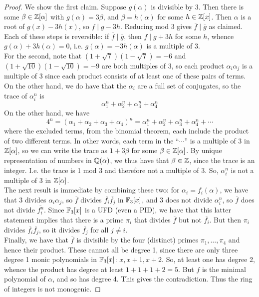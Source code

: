 \begin{proof} 
    We show the first claim. Suppose $g(\alpha)$ is divisible by 3. Then there is some $\beta \in \mathbb{Z}[\alpha]$ with $g(\alpha) = 3\beta$, and $\beta = h(\alpha)$ for some $h \in \mathbb{Z}[x]$. Then $\alpha$ is a root of $g(x)-3h(x)$, so $f \mid g-3h$. Reducing mod 3 gives $\overline{f} \mid \overline{g}$ as claimed. Each of these steps is reversible: if $\overline{f} \mid \overline{g}$, then $f \mid g+3h$ for some $h$, whence $g(\alpha)+3h(\alpha) = 0$, i.e. $g(\alpha) = -3h(\alpha)$ is a multiple of 3. \\

    For the second, note that $(1+\sqrt{7})(1-\sqrt{7}) = -6$ and $(1+\sqrt{10})(1-\sqrt{10}) = -9$ are both multiples of 3, so each product $\alpha_i\alpha_j$ is a multiple of 3 since each product consists of at least one of these pairs of terms. On the other hand, we do have that the $\alpha_i$ are a full set of conjugates, so the trace of $\alpha_i^n$ is
    \[ \alpha_1^n+\alpha_2^n+\alpha_3^n+\alpha_4^n \]
    On the other hand, we have
    \[ 4^n = (\alpha_1+\alpha_2+\alpha_3+\alpha_4)^n = \alpha_1^n+\alpha_2^n+\alpha_3^n+\alpha_4^n + \cdots \]
    where the excluded terms, from the binomial theorem, each include the product of two different terms. In other words, each term in the ``$\cdots$'' is a multiple of 3 in $\mathbb{Z}[\alpha]$, so we can write the trace as $1+3\beta$ for some $\beta \in \mathbb{Z}[\alpha]$. By unique representation of numbers in $\mathbb{Q}(\alpha)$, we thus have that $\beta \in \mathbb{Z}$, since the trace is an integer. I.e. the trace is 1 mod 3 and therefore not a multiple of 3. So, $\alpha_i^n$ is not a multiple of 3 in $\mathbb{Z}[\alpha]$. \\

    The next result is immediate by combining these two: for $\alpha_i = f_i(\alpha)$, we have that 3 divides $\alpha_i\alpha_j$, so $\overline{f}$ divides $\overline{f_i}\overline{f_j}$ in $\mathbb{F}_3[x]$, and 3 does not divide $\alpha_i^n$, so $\overline{f}$ does not divide $\overline{f_i^n}$. Since $\mathbb{F}_3[x]$ is a UFD (even a PID), we have that this latter statement implies that there is a prime $\pi_i$ that divides $\overline{f}$ but not $\overline{f_i}$. But then $\pi_i$ divides $\overline{f_i}\overline{f_j}$, so it divides $\overline{f_j}$ for all $j \neq i$. \\

    Finally, we have that $\overline{f}$ is divisible by the four (distinct) primes $\pi_1,\ldots,\pi_4$ and hence their product. These cannot all be degree 1, since there are only three degree 1 monic polynomials in $\mathbb{F}_3[x]$: $x, x+1, x+2$. So, at least one has degree 2, whence the product has degree at least $1+1+1+2 = 5$. But $f$ is the minimal polynomial of $\alpha$, and so has degree 4. This gives the contradiction. Thus the ring of integers is not monogenic.
\end{proof}
